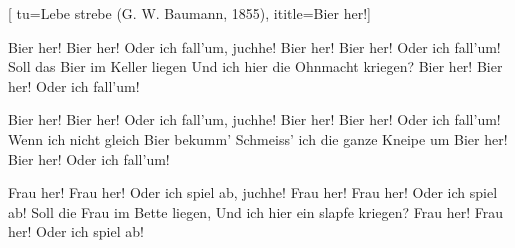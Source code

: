  [
tu={Lebe strebe (G. W. Baumann, 1855)}, 
ititle={Bier her!}]

\beginverse
Bier her! Bier her!
Oder ich fall'um, juchhe!
Bier her! Bier her!
Oder ich fall'um!
Soll das Bier im Keller liegen
Und ich hier die Ohnmacht kriegen?
Bier her! Bier her!
Oder ich fall'um!
\endverse

\beginverse
Bier her! Bier her!
Oder ich fall'um, juchhe!
Bier her! Bier her!
Oder ich fall'um!
Wenn ich nicht gleich Bier bekumm'
Schmeiss' ich die ganze Kneipe um
Bier her! Bier her!
Oder ich fall'um!
\endverse

\beginverse
Frau her! Frau her!
Oder ich spiel ab, juchhe!
Frau her! Frau her!
Oder ich spiel ab!
Soll die Frau im Bette liegen,
Und ich hier ein slapfe kriegen?
Frau her! Frau her!
Oder ich spiel ab!
\endverse
\endsong